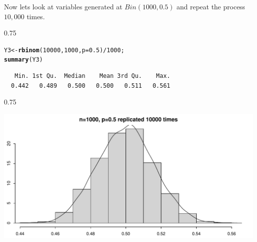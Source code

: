 \documentclass{beamer}\usepackage[]{graphicx}\usepackage[]{color}
\makeatletter
\newcommand{\hlnum}[1]{\textcolor[rgb]{0.2,0.2,0.2}{#1}}%
\newcommand{\hlopt}[1]{\textcolor[rgb]{0.102,0.102,0.102}{#1}}%
\newcommand{\hlstd}[1]{\textcolor[rgb]{0.102,0.102,0.102}{#1}}%
\newcommand{\hlkwb}[1]{\textcolor[rgb]{0.102,0.102,0.102}{#1}}%
\newcommand{\hlkwc}[1]{\textcolor[rgb]{0.2,0.2,0.2}{#1}}%
\newcommand{\hlkwd}[1]{\textcolor[rgb]{0.102,0.102,0.102}{\textbf{#1}}}%
\newenvironment{kframe}{%
 \def\at@end@of@kframe{}%
 \ifinner\ifhmode%
  \def\at@end@of@kframe{\end{minipage}}%
  \begin{minipage}{\columnwidth}%
 \fi\fi%
 \def\FrameCommand##1{\hskip\@totalleftmargin \hskip-\fboxsep
 \colorbox{shadecolor}{##1}\hskip-\fboxsep
     \hskip-\linewidth \hskip-\@totalleftmargin \hskip\columnwidth}%
 \MakeFramed {\advance\hsize-\width
   \@totalleftmargin\z@ \linewidth\hsize
   \@setminipage}}%
 {\par\unskip\endMakeFramed%
 \at@end@of@kframe}
\newenvironment{knitrout}{}{} %
\renewenvironment{knitrout}{\begin{spacing}{0.75}\begin{tiny}}{\end{tiny}\end{spacing}}
\makeatother
\begin{document}
\begin{frame}[fragile]

Now lets look at variables generated at $Bin(1000,0.5)$ and repeat the process $10,000$ times.

\begin{knitrout}\small
{}\color{fgcolor}\begin{kframe}
\begin{alltt}
\hlstd{Y3} \hlkwb{<-} \hlkwd{rbinom}\hlstd{(}\hlnum{10000}\hlstd{,} \hlnum{1000}\hlstd{,} \hlkwc{p}\hlstd{=}\hlnum{0.5}\hlstd{)}\hlopt{/} \hlnum{1000}\hlstd{;}
\hlkwd{summary}\hlstd{(Y3)}
\end{alltt}
\begin{verbatim}
   Min. 1st Qu.  Median    Mean 3rd Qu.    Max. 
  0.442   0.489   0.500   0.500   0.511   0.561 
\end{verbatim}
\end{kframe}
\end{knitrout}

\end{frame}

\begin{frame}[fragile]

\begin{knitrout}\small
{}\color{fgcolor}

{\centering \includegraphics[width=0.89\linewidth]{figure/graphics-unnamed-chunk-6-1} 

}



\end{knitrout}

\end{frame}
\end{document}
